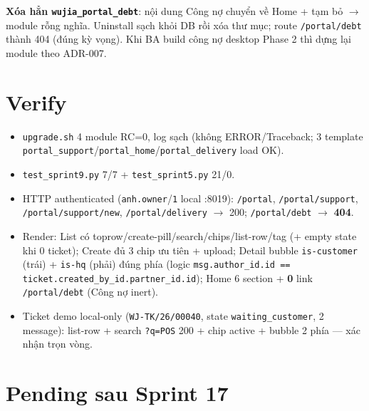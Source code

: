 \textbf{Xóa hẳn \texttt{wujia\_portal\_debt}}: nội dung Công nợ chuyển về Home + tạm bỏ
\(\rightarrow\) module rỗng nghĩa. Uninstall sạch khỏi DB rồi xóa thư mục; route
\texttt{/portal/debt} thành 404 (đúng kỳ vọng). Khi BA build công nợ desktop Phase 2 thì
dựng lại module theo ADR-007.

\section{Verify}

\begin{itemize}
  \item \texttt{upgrade.sh} 4 module RC=0, log sạch (không ERROR/Traceback; 3 template
        \texttt{portal\_support}/\texttt{portal\_home}/\texttt{portal\_delivery} load OK).
  \item \texttt{test\_sprint9.py} 7/7 + \texttt{test\_sprint5.py} 21/0.
  \item HTTP authenticated (\texttt{anh.owner}/\texttt{1} local :8019):
        \texttt{/portal}, \texttt{/portal/support}, \texttt{/portal/support/new},
        \texttt{/portal/delivery} \(\rightarrow\) 200; \texttt{/portal/debt}
        \(\rightarrow\) \textbf{404}.
  \item Render: List có toprow/create-pill/search/chips/list-row/tag (+ empty state khi 0
        ticket); Create đủ 3 chip ưu tiên + upload; Detail bubble \texttt{is-customer}
        (trái) + \texttt{is-hq} (phải) đúng phía (logic \texttt{msg.author\_id.id ==
        ticket.created\_by\_id.partner\_id.id}); Home 6 section + \textbf{0} link
        \texttt{/portal/debt} (Công nợ inert).
  \item Ticket demo local-only (\texttt{WJ-TK/26/00040}, state \texttt{waiting\_customer},
        2 message): list-row + search \texttt{?q=POS} 200 + chip active + bubble 2 phía ---
        xác nhận trọn vòng.
\end{itemize}

\section{Pending sau Sprint 17}

